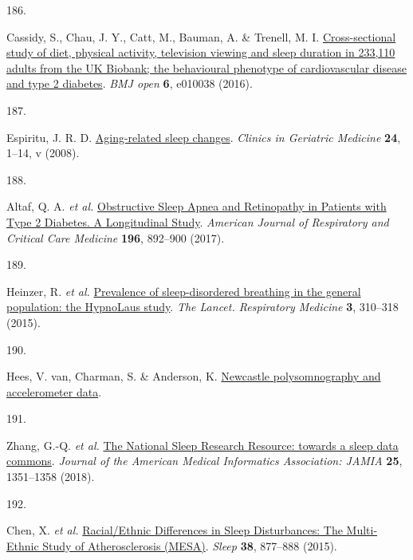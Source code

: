 \documentclass[
  10pt,
]{scrbook}
\newlength{\cslhangindent}
\newlength{\csllabelwidth}
\newlength{\cslentryspacingunit} %
\newenvironment{CSLReferences}[2] %
 {%
  \setlength{\parindent}{0pt}
  \ifodd #1
  \let\oldpar\par
  \def\par{\hangindent=\cslhangindent\oldpar}
  \fi
  \setlength{\parskip}{#2\cslentryspacingunit}
 }%
 {}
\newcommand{\CSLLeftMargin}[1]{\parbox[t]{\csllabelwidth}{#1}}
\newcommand{\CSLRightInline}[1]{\parbox[t]{\linewidth - \csllabelwidth}{#1}\break}
\let\originaltextbf\textbf
\renewcommand{\textbf}[1]{\textcolor{color1}{\textsf{\originaltextbf{#1}}}}
\begin{document}
\begin{CSLReferences}{0}{0}
\leavevmode{}%
\CSLLeftMargin{186. }%
\CSLRightInline{Cassidy, S., Chau, J. Y., Catt, M., Bauman, A. \&
Trenell, M. I.
\href{https://doi.org/10.1136/bmjopen-2015-010038}{Cross-sectional study
of diet, physical activity, television viewing and sleep duration in
233,110 adults from the UK Biobank; the behavioural phenotype of
cardiovascular disease and type 2 diabetes}. \emph{BMJ open} \textbf{6},
e010038 (2016).}

\leavevmode{}%
\CSLLeftMargin{187. }%
\CSLRightInline{Espiritu, J. R. D.
\href{https://doi.org/10.1016/j.cger.2007.08.007}{Aging-related sleep
changes}. \emph{Clinics in Geriatric Medicine} \textbf{24}, 1--14, v
(2008).}

\leavevmode{}%
\CSLLeftMargin{188. }%
\CSLRightInline{Altaf, Q. A. \emph{et al.}
\href{https://doi.org/10.1164/rccm.201701-0175OC}{Obstructive Sleep
Apnea and Retinopathy in Patients with Type 2 Diabetes. A Longitudinal
Study}. \emph{American Journal of Respiratory and Critical Care
Medicine} \textbf{196}, 892--900 (2017).}

\leavevmode{}%
\CSLLeftMargin{189. }%
\CSLRightInline{Heinzer, R. \emph{et al.}
\href{https://doi.org/10.1016/S2213-2600(15)00043-0}{Prevalence of
sleep-disordered breathing in the general population: the HypnoLaus
study}. \emph{The Lancet. Respiratory Medicine} \textbf{3}, 310--318
(2015).}

\leavevmode{}%
\CSLLeftMargin{190. }%
\CSLRightInline{Hees, V. van, Charman, S. \& Anderson, K.
\href{https://doi.org/10.5281/zenodo.1160410}{Newcastle polysomnography
and accelerometer data}.}

\leavevmode{}%
\CSLLeftMargin{191. }%
\CSLRightInline{Zhang, G.-Q. \emph{et al.}
\href{https://doi.org/10.1093/jamia/ocy064}{The National Sleep Research
Resource: towards a sleep data commons}. \emph{Journal of the American
Medical Informatics Association: JAMIA} \textbf{25}, 1351--1358 (2018).}

\leavevmode{}%
\CSLLeftMargin{192. }%
\CSLRightInline{Chen, X. \emph{et al.}
\href{https://doi.org/10.5665/sleep.4732}{Racial/Ethnic Differences in
Sleep Disturbances: The Multi-Ethnic Study of Atherosclerosis (MESA)}.
\emph{Sleep} \textbf{38}, 877--888 (2015).}


\end{CSLReferences}
\end{document}
